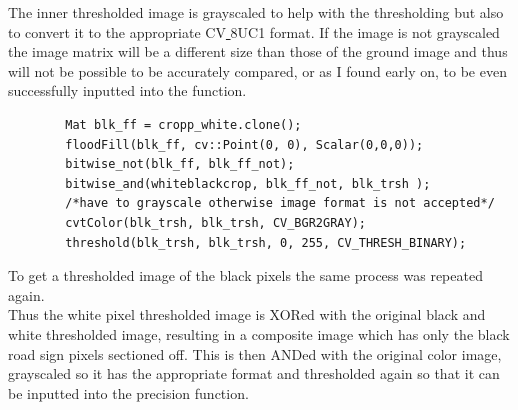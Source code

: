 \documentclass{article}
\begin{document}
The inner thresholded image is grayscaled to help with the thresholding but also to convert it to the appropriate CV\underline{ }8UC1 format. If the image is not grayscaled the image matrix will be a different size than those of the ground image and thus will not be possible to be accurately compared, or as I found early on, to be even successfully inputted into the function.\\
\begin{lstlisting}
		Mat blk_ff = cropp_white.clone();
		floodFill(blk_ff, cv::Point(0, 0), Scalar(0,0,0));
		bitwise_not(blk_ff, blk_ff_not);
		bitwise_and(whiteblackcrop, blk_ff_not, blk_trsh );
		/*have to grayscale otherwise image format is not accepted*/
		cvtColor(blk_trsh, blk_trsh, CV_BGR2GRAY);
		threshold(blk_trsh, blk_trsh, 0, 255, CV_THRESH_BINARY);
\end{lstlisting}
To get a thresholded image of the black pixels the same process was repeated again. \\
Thus the white pixel thresholded image is XORed with the original black and white thresholded image, resulting in a composite image which has only the black road sign pixels sectioned off. This is then ANDed with the original color image, grayscaled so it has the appropriate format and thresholded again so that it can be inputted into the precision function.\\
\end{document}
